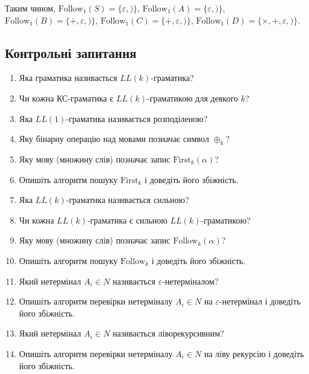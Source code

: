 Таким чином, $\text{Follow}_1 (S) = \{\varepsilon, )\}$, $\text{Follow}_1 (A) = \{\varepsilon, )\}$, $\text{Follow}_1 (B) = \{+,\varepsilon, )\}$, $\text{Follow}_1 (C) = \{+,\varepsilon, )\}$, $\text{Follow}_1 (D) = \{\times,+,\varepsilon, )\}$.

\subsection{Контрольні запитання}
\begin{enumerate}
	\item Яка граматика називається $LL(k)$-граматика? %
	\item Чи кожна КС-граматика є $LL(k)$-граматикою для деякого $k$? %
	\item Яка $LL(1)$-граматика називається розподіленою? %
	\item Яку бінарну операцію над мовами позначає символ $\oplus_k$? %
	\item Яку мову (множину слів) позначає запис $\text{First}_k(\alpha)$? %
	\item Опишіть алгоритм пошуку $\text{First}_k$ і доведіть його збіжність.
	\item Яка $LL(k)$-граматика називається сильною? %
	\item Чи кожна $LL(k)$-граматика є сильною $LL(k)$-граматикою? %
	\item Яку мову (множину слів) позначає запис $\text{Follow}_k(\alpha)$? %
	\item Опишіть алгоритм пошуку $\text{Follow}_k$ і доведіть його збіжність.
	\item Який нетермінал $A_i \in N$ називається $\varepsilon$-нетерміналом? %
	\item Опишіть алгоритм перевірки нетерміналу $A_i \in N$ на $\varepsilon$-нетермінал і доведіть його збіжність.
	\item Який нетермінал $A_i \in N$ називається ліворекурсивним? %
	\item Опишіть алгоритм перевірки нетерміналу $A_i \in N$ на ліву рекурсію і доведіть його збіжність.
\end{enumerate}
